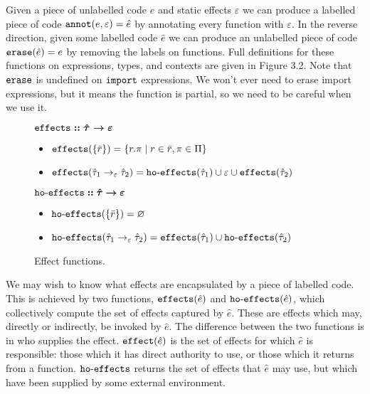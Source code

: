 \noindent
Given a piece of unlabelled code $e$ and static effects $\varepsilon$ we can produce a labelled piece of code $\mathtt{annot}(e, \varepsilon) = \hat e$ by annotating every function with $\varepsilon$. In the reverse direction, given some labelled code $\hat e$ we can produce an unlabelled piece of code $\mathtt{erase}(\hat e) = e$ by removing the labels on functions. Full definitions for these functions on expressions, types, and contexts are given in Figure 3.2. Note that $\mathtt{erase}$ is undefined on $\mathtt{import}$ expressions. We won't ever need to erase import expressions, but it means the function is partial, so we need to be careful when we use it.













\begin{figure}[h]

$\bm{\mathtt{effects :: \hat \tau \rightarrow \varepsilon}}$ \begin{itemize}
	\setlength\itemsep{-0.7em}
	\item[] $\mathtt{effects}(\{ \bar r \}) = \{ r.\pi \mid r \in \bar r, \pi \in \Pi \}$
	\item[] $\mathtt{effects}(\hat \tau_1 \rightarrow_{\varepsilon} \hat \tau_2) = \mathtt{ho \hbox{-} effects}(\hat \tau_1) \cup \varepsilon \cup \mathtt{effects}(\hat \tau_2)$
\end{itemize}

$\bm{\mathtt{ho \hbox{-} effects} :: \hat \tau \rightarrow \varepsilon}$ \begin{itemize}
	\setlength\itemsep{-0.7em}
	\item[] $\mathtt{ho \hbox{-} effects}(\{ \bar r \}) = \varnothing$
	\item[] $\mathtt{ho \hbox{-} effects}(\hat \tau_1 \rightarrow_{\varepsilon} \hat \tau_2) = \mathtt{effects}(\hat \tau_1) \cup \mathtt{ho \hbox{-} effects}(\hat \tau_2)$
\end{itemize}

\vspace{-7pt}
\caption{Effect functions.}
\label{This is the label.}
\end{figure}

\noindent
We may wish to know what effects are encapsulated by a piece of labelled code. This is achieved by two functions, $\mathtt{effects}(\hat e)$ and $\mathtt{ho \hbox{-} effects}(\hat e)$, which collectively compute the set of effects captured by $\hat e$. These are effects which may, directly or indirectly, be invoked by $\hat e$. The difference between the two functions is in who supplies the effect. $\mathtt{effect}(\hat e)$ is the set of effects for which $\hat e$ is responsible: those which it has direct authority to use, or those which it returns from a function. $\mathtt{ho \hbox{-} effects}$ returns the set of effects that $\hat e$ may use, but which have been supplied by some external environment.

